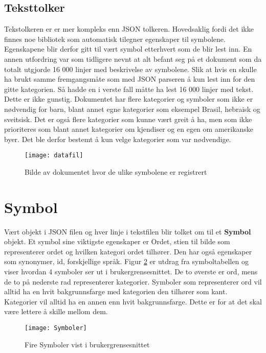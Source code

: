 \subsection{Teksttolker}

Tekstolkeren er er mer kompleks enn JSON tolkeren. Hovedsaklig fordi det ikke finnes noe bibliotek som automatisk tilegner egenskaper til symbolene. Egenskapene blir derfor gitt til vært symbol etterhvert som de blir lest inn. En annen utfordring var som tidligere nevnt at alt befant seg på et dokument som da totalt utgjorde 16 000 linjer med beskrivelse av symbolene. Slik at hvis en skulle ha brukt samme fremgangsmåte som med JSON parseren å kun lest inn for den gitte kategorien. Så hadde en i verste fall måtte ha lest 16 000 linjer med tekst. Dette er ikke gunstig. Dokumentet har flere kategorier og symboler som ikke er nødvendig for barn, blant annet egne kategorier som eksempel Brasil, hebraisk og sveitsisk. Det er også flere kategorier som kunne vært greit å ha, men som ikke prioriteres som blant annet kategorier om kjendiser og en egen om amerikanske byer. Det ble derfor bestemt å kun velge kategorier som var nødvendige.

\begin{figure}[ht!] 
\centering 
\texttt{[image: datafil]} 
\caption{Bilde av dokumentet hvor de ulike symbolene er registrert} 
\label{fig:dok} 
\end{figure} 


\section{Symbol}

Vært objekt i JSON filen og hver linje i tekstfilen blir tolket om til et \textbf{Symbol} objekt. Et symbol sine viktigste egenskaper er Ordet, stien til bilde som representerer ordet og hvilken kategori ordet tilhører. Den har også egenskaper som synonymer, id, forskjellige språk. Figur \ref{fig:symb} er utdrag fra symboltabellen og viser hvordan 4 symboler ser ut i brukergrensesnittet. De to øverste er ord, mens de to på nederste rad representerer kategorier. Symboler som representerer ord vil alltid ha en hvit bakgrunnsfarge med kategorien den tilhører som kant. Kategorier vil alltid ha en annen enn hvit bakgrunnsfarge. Dette er for at det skal være lettere å skille mellom dem.

 \begin{figure}[ht!] 
\centering 
\texttt{[image: Symboler]} 
\caption{Fire Symboler vist i brukergrensesnittet} 
\label{fig:symb} 
\end{figure} 

